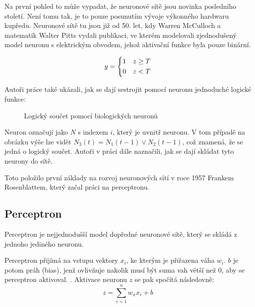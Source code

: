 \documentclass[FM,BP,fonts]{tulthesis}
\begin{document}
Na první pohled to může vypadat, že neuronové sítě jsou novinka posledního století. Není tomu tak, je to pouze posunutím vývoje výkonného hardwaru kupředu. Neuronové sítě tu jsou již od 50. let, kdy Warren McCulloch a matematik Walter Pitts vydali publikaci, ve kterém modelovali zjednodušený model neuronu s elektrickým obvodem, jehož aktivační funkce byla pouze binární. \cite{mcculloch1943logical}

\begin{equation}
	y = \begin{dcases}
		1 & z \geq T \\
		0 & z < T
	\end{dcases}
\end{equation}

Autoři práce také ukázali, jak se dají sestrojit pomocí neuronu jednoduché logické funkce: 

\begin{figure}[htbp]
	\centering
	\caption{Logický součet pomocí biologických neuronů}
	\label{fig:logic_or}
\end{figure}

Neuron označují jako $N$ s indexem $i$, který je uvnitř neuronu. V tom případě na obrázku výše lze vidět $N_3(t) = N_1(t-1) \vee N_2(t-1)$, což znamená, že se jedná o logický součet. \cite{mcculloch1943logical} Autoři v práci dále naznačili, jak se dají skládat tyto neurony do sítě. 

Toto položilo první základy na rozvoj neuronových sítí v roce 1957 Frankem Rosenblattem, který začal práci na perceptronu.
\newpage
\subsection{Perceptron}
Perceptron je nejjednodušší model dopředné neuronové sítě, který se skládá z jednoho jediného neuronu.

Perceptron přijímá na vstupu vektory $x_i$, ke kterým je přiřazena váha $w_i$. $b$ je potom práh (bias), jenž ovlivňuje nakolik musí být suma vah větší než 0, aby se perceptron aktivoval. \cite{martinpilatNN}. Aktivace neuronu $z$ se pak spočítá následovně:
\label{eq:activation_percep}
\begin{equation}
	z = \sum_{i=1}^{n} w_xx_i + b
\end{equation}
\end{document}

